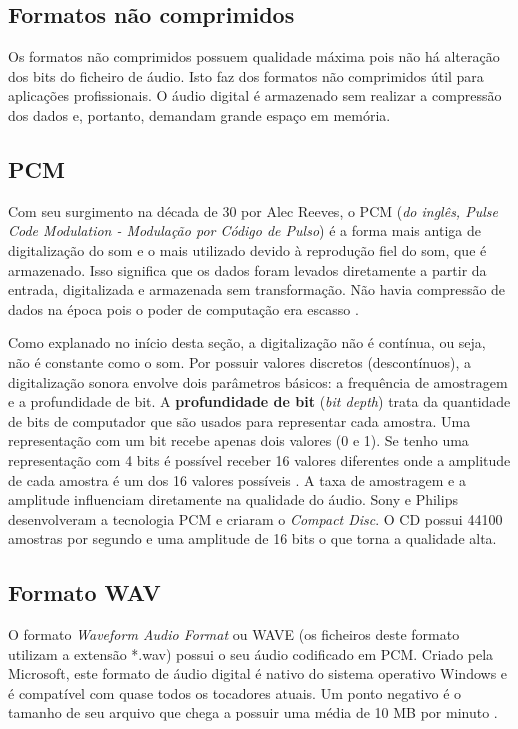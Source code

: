 \subsection{Formatos não comprimidos}

Os formatos não comprimidos possuem qualidade máxima pois não há alteração dos bits do ficheiro de áudio. Isto faz dos formatos não comprimidos útil para aplicações profissionais. O áudio digital é armazenado sem realizar a compressão dos dados e, portanto, demandam grande espaço em memória.

\subsection{PCM}

Com seu surgimento na década de 30 por Alec Reeves, o PCM (\textit{do inglês, Pulse Code Modulation - Modulação por Código de Pulso}) é a forma mais antiga de digitalização do som e o mais utilizado devido à reprodução fiel do som, que é armazenado. Isso significa que os dados foram levados diretamente a partir da entrada, digitalizada e armazenada sem transformação. Não havia compressão de dados na época pois o poder de computação era escasso \cite{pcm}.


Como explanado no início desta seção, a digitalização não é contínua, ou seja, não é constante como o som. Por possuir valores discretos (descontínuos), a digitalização sonora envolve dois parâmetros básicos: a frequência de amostragem e a profundidade de bit. A \textbf{profundidade de bit} (\textit{bit depth}) trata da quantidade de bits de computador que são usados para representar cada amostra. Uma representação com um bit recebe apenas dois valores (0 e 1). Se tenho uma representação com 4 bits é possível receber 16 valores diferentes onde a amplitude de cada amostra é um dos 16 valores possíveis \cite{pcm}. A taxa de amostragem e a amplitude influenciam diretamente na qualidade do áudio. Sony e Philips desenvolveram a tecnologia PCM e criaram o \textit{Compact Disc}. O CD possui 44100 amostras por segundo e uma amplitude de 16 bits o que torna a qualidade alta.


\subsection{Formato WAV}

O formato \textit{Waveform Audio Format} ou WAVE (os ficheiros deste formato utilizam a extensão *.wav) possui o seu áudio codificado em PCM. Criado pela Microsoft, este formato de áudio digital é nativo do sistema operativo Windows e é compatível com quase todos os tocadores atuais. Um ponto negativo é o tamanho de seu arquivo que chega a possuir uma média de 10 MB por minuto \cite{serraaudio}.

